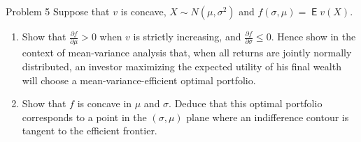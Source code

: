 \documentclass[10pt]{beamer}
\newcommand{\ds}{\displaystyle}
\DeclareMathOperator\expc{\mathsf{E}}
\theoremstyle{definition}
\begin{document}
\begin{frame}[allowframebreaks]
\begin{enumerate}
  \end{enumerate}
\end{frame}

\begin{frame}{Problem 5}
  Suppose that $v$ is concave, $X\sim N(\mu,\sigma^2)$ and $f(\sigma, \mu) = \expc v(X)$.
  \begin{enumerate}
    \item Show that $\ds\frac{\partial f}{\partial\mu} > 0$ when $v$ is strictly increasing, and $\ds\frac{\partial f}{\partial\sigma}\leqslant 0$. Hence show in the context of mean-variance analysis that, when all returns are jointly normally distributed, an investor maximizing the expected utility of his final wealth will choose a mean-variance-efficient optimal portfolio.
    \item Show that $f$ is concave in $\mu$ and $\sigma$. Deduce that this optimal portfolio corresponds to a point in the $(\sigma,\mu)$ plane where an indifference contour is tangent to the efficient frontier.
  \end{enumerate}
\end{frame}
\end{document}
